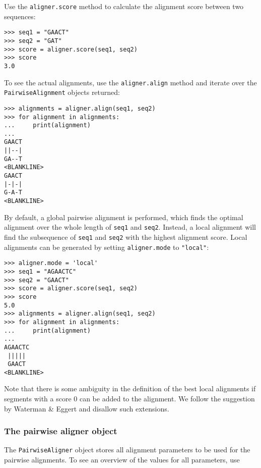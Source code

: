 Use the \verb+aligner.score+ method to calculate the alignment score between
two sequences:

\begin{verbatim}
>>> seq1 = "GAACT"
>>> seq2 = "GAT"
>>> score = aligner.score(seq1, seq2)
>>> score
3.0
\end{verbatim}

To see the actual alignments, use the \verb+aligner.align+ method and iterate over the \verb+PairwiseAlignment+ objects returned:

\begin{verbatim}
>>> alignments = aligner.align(seq1, seq2)
>>> for alignment in alignments:
...     print(alignment)
... 
GAACT
||--|
GA--T
<BLANKLINE>
GAACT
|-|-|
G-A-T
<BLANKLINE>
\end{verbatim}

By default, a global pairwise alignment is performed, which finds the optimal
alignment over the whole length of \verb+seq1+ and \verb+seq2+.
Instead, a local alignment will find the subsequence of
\verb+seq1+ and \verb+seq2+ with the highest alignment score.
Local alignments can be generated by setting \verb+aligner.mode+ to
\verb+"local"+:

\begin{verbatim}
>>> aligner.mode = 'local'
>>> seq1 = "AGAACTC"
>>> seq2 = "GAACT"
>>> score = aligner.score(seq1, seq2)
>>> score
5.0
>>> alignments = aligner.align(seq1, seq2)
>>> for alignment in alignments:
...     print(alignment)
...
AGAACTC
 ||||| 
 GAACT 
<BLANKLINE>
\end{verbatim}

Note that there is some ambiguity in the definition of the best local alignments if segments with a score 0 can be added to the alignment. We follow the suggestion by Waterman \& Eggert \cite{waterman1987} and disallow such extensions.

\subsubsection{The pairwise aligner object}
\label{sec:pairwise-aligner}

The \verb+PairwiseAligner+ object stores all alignment parameters to be used
for the pairwise alignments. To see an overview of the values for all parameters, use

